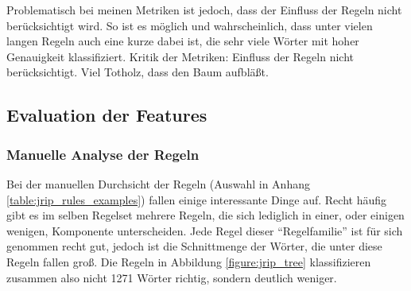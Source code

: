 Problematisch bei meinen Metriken ist jedoch, dass der Einfluss der Regeln nicht berücksichtigt wird. So ist es möglich und wahrscheinlich, dass unter vielen langen Regeln auch eine kurze dabei ist, die sehr viele Wörter mit hoher Genauigkeit klassifiziert.
Kritik der Metriken: Einfluss der Regeln nicht berücksichtigt. Viel Totholz, dass den Baum aufbläßt.


\subsection{Evaluation der Features}

\subsubsection{Manuelle Analyse der Regeln}
Bei der manuellen Durchsicht der Regeln (Auswahl in Anhang \ref{table:jrip_rules_examples}) fallen einige interessante Dinge auf. Recht häufig gibt es im selben Regelset mehrere Regeln, die sich lediglich in einer, oder einigen wenigen, Komponente unterscheiden. Jede Regel dieser \enquote{Regelfamilie} ist für sich genommen recht gut, jedoch ist die Schnittmenge der Wörter, die unter diese Regeln fallen groß. Die Regeln in Abbildung \ref{figure:jrip_tree} klassifizieren zusammen also nicht 1271 Wörter richtig, sondern deutlich weniger.

